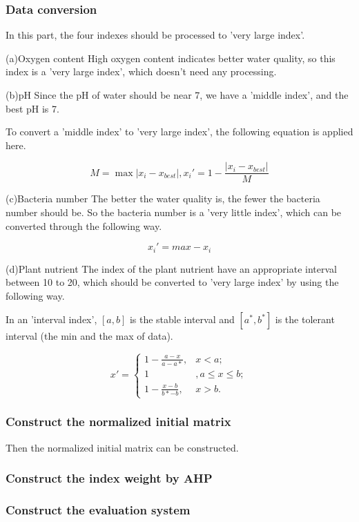 \subsubsection{Data conversion}
In this part, the four indexes should be processed to 'very large index'.

(a)Oxygen content
High oxygen content indicates better water quality, so this index is a 'very large index', which doesn't need any processing.

(b)pH
Since the pH of water should be near 7, we have a 'middle index', and the best pH is 7.

To convert a 'middle index' to 'very large index', the following equation is applied here.

\begin{equation*}
    M = \max {|x_i-x_{best}|} , x_i' = 1 - \frac{|x_i-x_{best}|}{M}
\end{equation*}

(c)Bacteria number
The better the water quality is, the fewer the bacteria number should be. So the bacteria number is a 'very little index', which can be converted through the following way.

\begin{equation*}
    x_i' = max - x_i
\end{equation*}

(d)Plant nutrient
The index of the plant nutrient have an appropriate interval between 10 to 20, which should be converted to 'very large index' by using the following way.

In an 'interval index', $[a,b]$ is the stable interval and $[a^*,b^*]$ is the tolerant interval (the min and the max of data).

\begin{equation*}
    x' = \begin{cases}
    1 - \frac{a-x}{a-a*}, & x<a ; \\
    1 &, a \leq x \leq b ; \\
    1 - \frac{x-b}{b*-b}, & x>b .
    \end{cases}
\end{equation*}

\subsubsection{Construct the normalized initial matrix}
Then the normalized initial matrix can be constructed.

\subsubsection{Construct the index weight by AHP}

\subsubsection{Construct the evaluation system}